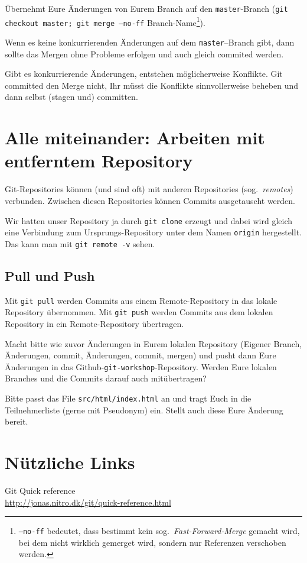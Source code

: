 \documentclass[a4paper, 12pt]{article}
\newcounter{enumisave}
\newenvironment{enumerate*}%
{\begin{enumerate}\setcounter{enumi}{\theenumisave}}%
{\setcounter{enumisave}{\theenumi}\end{enumerate}}
\begin{document}
\begin{enumerate*}

\item Übernehmt Eure Änderungen von Eurem Branch auf den \texttt{master}-Branch (\texttt{git checkout master; git merge --no-ff} \textsf{Branch-Name}\footnote{\texttt{--no-ff} bedeutet, dass bestimmt kein sog.\ \emph{Fast-Forward-Merge} gemacht wird, bei dem nicht wirklich gemerget wird, sondern nur Referenzen verschoben werden.}).

Wenn es keine konkurrierenden Änderungen auf dem \texttt{master}--Branch gibt,
dann sollte das Mergen ohne Probleme erfolgen und auch gleich commited werden.

Gibt es konkurrierende Änderungen, entstehen möglicherweise Konflikte. Git committed den Merge nicht, Ihr müsst die Konflikte sinnvollerweise beheben und
dann selbst (stagen und) committen.

\end{enumerate*}

\newpage
\section{Alle miteinander: Arbeiten mit entferntem Repository}
Git-Repositories können (und sind oft) mit anderen Repositories (sog.\ \emph{remotes}) verbunden. Zwischen diesen Repositories können Commits ausgetauscht
werden. 

Wir hatten unser Repository ja durch \texttt{git clone} erzeugt und dabei wird gleich eine Verbindung zum Ursprungs-Repository unter dem Namen \texttt{origin} hergestellt. Das kann man mit \texttt{git remote -v} sehen.


\subsection*{Pull und Push}\vspace{-1.5ex}
Mit \texttt{git pull} werden Commits aus einem Remote-Repository in das lokale
Repository übernommen. Mit \texttt{git push} werden Commits aus dem lokalen Repository in ein Remote-Repository übertragen.

\begin{enumerate*}
\item Macht bitte wie zuvor Änderungen in Eurem lokalen Repository (Eigener Branch, Änderungen, commit, Änderungen, commit, mergen) und pusht dann Eure Änderungen in das Github-\texttt{git-workshop}-Repository. Werden Eure lokalen Branches und die Commits darauf auch mitübertragen?

\item Bitte passt das File \texttt{src/html/index.html} an und tragt Euch in die Teilnehmerliste (gerne mit Pseudonym) ein. Stellt auch diese Eure Änderung bereit.

\end{enumerate*}


\vfill
\section*{Nützliche Links}

Git Quick reference\\
\url{http://jonas.nitro.dk/git/quick-reference.html}
\end{document}
